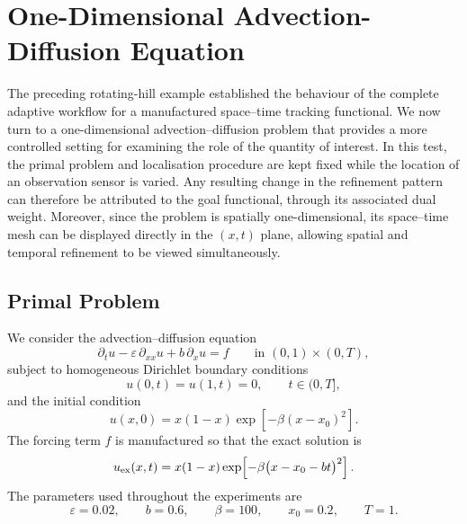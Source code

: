 \section{One-Dimensional Advection-Diffusion Equation}
\label{sec: exp-1d}

The preceding rotating-hill example established the behaviour of the complete adaptive workflow for a manufactured space--time tracking functional. We now turn to a one-dimensional advection--diffusion problem that provides a more controlled setting for examining the role of the quantity of interest. In this test, the primal problem and localisation procedure are kept fixed while the location of an observation sensor is varied. Any resulting change in the refinement pattern can therefore be attributed to the goal functional, through its associated dual weight. Moreover, since the problem is spatially one-dimensional, its space--time mesh can be displayed directly in the \((x,t)\) plane, allowing spatial and temporal refinement to be viewed simultaneously.


\subsection{Primal Problem}

We consider the advection--diffusion equation
\begin{equation}
  \partial_t u
  - \varepsilon\,\partial_{xx}u
  + b\,\partial_xu
  = f
  \qquad
  \text{in }(0,1)\times(0,T),
  \label{eq:advection-diffusion-1d}
\end{equation}
subject to homogeneous Dirichlet boundary conditions
\begin{equation}
  u(0,t)=u(1,t)=0,
  \qquad t\in(0,T],
\end{equation}
and the initial condition
\begin{equation}
  u(x,0)
  =
  x(1-x)
  \exp\!\left[-\beta(x-x_0)^2\right].
\end{equation}
The forcing term $f$ is manufactured so that the exact solution is
\begin{equation}
  u_{\rm{ex}}(x,t)
  =
  x(1-x)
  \exp\!\left[
    -\beta\bigl(x-x_0-bt\bigr)^2
  \right].
  \label{eq:moving-pulse}
\end{equation}
The parameters used throughout the experiments are
\begin{equation*}
  \varepsilon=0.02,
  \qquad
  b=0.6,
  \qquad
  \beta=100,
  \qquad
  x_0=0.2,
  \qquad
  T=1.
\end{equation*}


